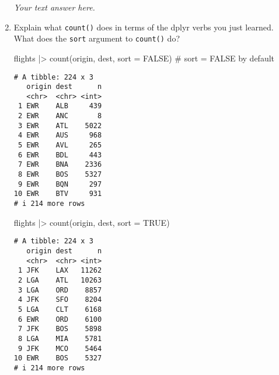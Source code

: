\documentclass[
  letterpaper,
  DIV=11,
  numbers=noendperiod]{scrreprt}
\newenvironment{Shaded}{\begin{snugshade}}{\end{snugshade}}
\newcommand{\AttributeTok}[1]{\textcolor[rgb]{0.40,0.45,0.13}{#1}}
\newcommand{\CommentTok}[1]{\textcolor[rgb]{0.37,0.37,0.37}{#1}}
\newcommand{\ConstantTok}[1]{\textcolor[rgb]{0.56,0.35,0.01}{#1}}
\newcommand{\FunctionTok}[1]{\textcolor[rgb]{0.28,0.35,0.67}{#1}}
\newcommand{\NormalTok}[1]{\textcolor[rgb]{0.00,0.23,0.31}{#1}}
\newcommand{\SpecialCharTok}[1]{\textcolor[rgb]{0.37,0.37,0.37}{#1}}
\begin{document}
\begin{enumerate}
\begin{tcolorbox}
  \emph{Your text answer here.}

  \end{tcolorbox}
\item
  Explain what \texttt{count()} does in terms of the dplyr verbs you
  just learned. What does the \texttt{sort} argument to \texttt{count()}
  do?

  \begin{tcolorbox}[enhanced jigsaw, breakable, bottomtitle=1mm, left=2mm, colback=white, toprule=.15mm, leftrule=.75mm, colframe=quarto-callout-note-color-frame, colbacktitle=quarto-callout-note-color!10!white, title={Answer}, coltitle=black, toptitle=1mm, bottomrule=.15mm, opacitybacktitle=0.6, arc=.35mm, rightrule=.15mm, titlerule=0mm, opacityback=0]

\begin{Shaded}
\begin{Highlighting}[]
\NormalTok{flights }\SpecialCharTok{|\textgreater{}} 
  \FunctionTok{count}\NormalTok{(origin, dest, }\AttributeTok{sort =} \ConstantTok{FALSE}\NormalTok{) }\CommentTok{\# sort = FALSE by   default}
\end{Highlighting}
\end{Shaded}

\begin{verbatim}
# A tibble: 224 x 3
   origin dest      n
   <chr>  <chr> <int>
 1 EWR    ALB     439
 2 EWR    ANC       8
 3 EWR    ATL    5022
 4 EWR    AUS     968
 5 EWR    AVL     265
 6 EWR    BDL     443
 7 EWR    BNA    2336
 8 EWR    BOS    5327
 9 EWR    BQN     297
10 EWR    BTV     931
# i 214 more rows
\end{verbatim}

\begin{Shaded}
\begin{Highlighting}[]
\NormalTok{flights }\SpecialCharTok{|\textgreater{}} 
  \FunctionTok{count}\NormalTok{(origin, dest, }\AttributeTok{sort =} \ConstantTok{TRUE}\NormalTok{)}
\end{Highlighting}
\end{Shaded}

\begin{verbatim}
# A tibble: 224 x 3
   origin dest      n
   <chr>  <chr> <int>
 1 JFK    LAX   11262
 2 LGA    ATL   10263
 3 LGA    ORD    8857
 4 JFK    SFO    8204
 5 LGA    CLT    6168
 6 EWR    ORD    6100
 7 JFK    BOS    5898
 8 LGA    MIA    5781
 9 JFK    MCO    5464
10 EWR    BOS    5327
# i 214 more rows
\end{verbatim}


\end{tcolorbox}
\end{enumerate}
\end{document}
